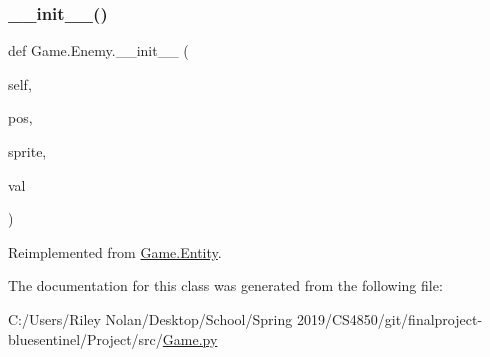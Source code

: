 \subsubsection{\texorpdfstring{\_\_init\_\_()}{\_\_init\_\_()}}
{\footnotesize\ttfamily def Game.\+Enemy.\+\_\+\+\_\+init\+\_\+\+\_\+ (\begin{DoxyParamCaption}\item[{}]{self,  }\item[{}]{pos,  }\item[{}]{sprite,  }\item[{}]{val }\end{DoxyParamCaption})}



Reimplemented from \mbox{\hyperlink{class_game_1_1_entity_a1cbc73a05ee02271fa7dca66f3a83ecf}{Game.\+Entity}}.



The documentation for this class was generated from the following file\+:\begin{DoxyCompactItemize}
\item 
C\+:/\+Users/\+Riley Nolan/\+Desktop/\+School/\+Spring 2019/\+C\+S4850/git/finalproject-\/bluesentinel/\+Project/src/\mbox{\hyperlink{_game_8py}{Game.\+py}}\end{DoxyCompactItemize}
